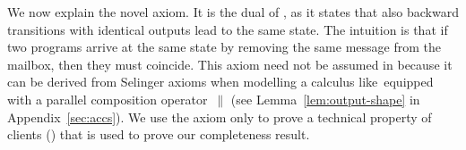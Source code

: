 


We now explain the novel \outputdeterminacyinv axiom.  It is the dual of \outputdeterminacy, as it states that also backward transitions with identical outputs lead to the same state. The intuition is that if two programs arrive at the same state by removing the same message from the mailbox, then they must coincide. %
This axiom need not be assumed in \cite{DBLP:conf/concur/Selinger97} because it can be derived from Selinger axioms when modelling a calculus like~\ACCS equipped with a parallel composition operator~$\parallel$ (see Lemma~\ref{lem:output-shape} in Appendix~\ref{sec:accs}).  We use the \outputdeterminacyinv axiom only to prove a technical property of clients () that is used to prove our completeness result.



